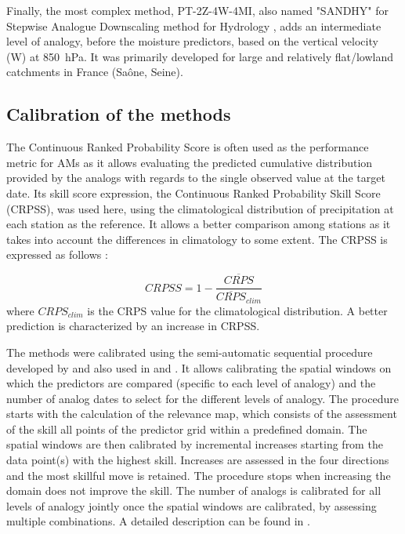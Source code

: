 \documentclass[alpha-refs]{wiley-article}
\begin{document}
Finally, the most complex method, PT-2Z-4W-4MI, also named "SANDHY" for Stepwise Analogue Downscaling method for Hydrology \citep{BenDaoud2016, Caillouet2016}, adds an intermediate level of analogy, before the moisture predictors, based on the vertical velocity (W) at 850~hPa. It was primarily developed for large and relatively flat/lowland catchments in France (Sa\^{o}ne, Seine).


\subsection{Calibration of the methods} %
\label{sec:calibration}

The Continuous Ranked Probability Score \citep[CRPS,][]{Brown1974, Matheson1976, Hersbach2000} is often used as the performance metric for AMs as it allows evaluating the predicted cumulative distribution provided by the analogs with regards to the single observed value at the target date. Its skill score expression, the Continuous Ranked Probability Skill Score (CRPSS), was used here, using the climatological distribution of precipitation at each station as the reference. It allows a better comparison among stations as it takes into account the differences in climatology to some extent. The CRPSS is expressed as follows \citep{Bradley2011}:

\begin{equation}
	\label{eq:CRPSS}
	CRPSS = 1-\frac{\overline{CRPS}}{\overline{CRPS}_{clim}}
\end{equation}
where $CRPS_{clim}$ is the CRPS value for the climatological distribution. A better prediction is characterized by an increase in CRPSS.

The methods were calibrated using the semi-automatic sequential procedure developed by \citet{Bontron2004} and also used in \citet{Radanovics2013} and \citet{BenDaoud2016}. It allows calibrating the spatial windows on which the predictors are compared (specific to each level of analogy) and the number of analog dates to select for the different levels of analogy. The procedure starts with the calculation of the relevance map, which consists of the assessment of the skill all points of the predictor grid within a predefined domain. The spatial windows are then calibrated by incremental increases starting from the data point(s) with the highest skill. Increases are assessed in the four directions and the most skillful move is retained. The procedure stops when increasing the domain does not improve the skill. The number of analogs is calibrated for all levels of analogy jointly once the spatial windows are calibrated, by assessing multiple combinations. A detailed description can be found in \citet{Horton2019}. 
\end{document}
